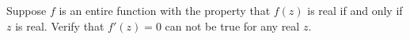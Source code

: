 Suppose $f$ is an entire function with the property that $f(z)$ is
real if and only if $z$ is real. Verify that $f'(z)=0$ can not be true
for any real $z$.
